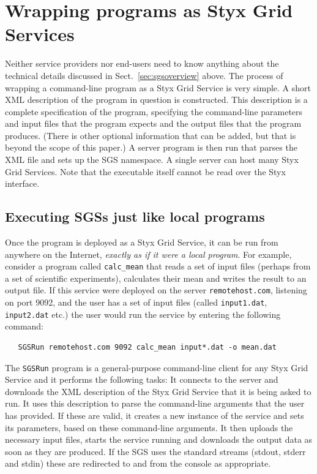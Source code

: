 \documentclass{llncs}
\begin{document}
\section{Wrapping programs as Styx Grid Services}\label{sec:wrapping}
Neither service providers nor end-users need to know anything about the technical details discussed in Sect.~\ref{sec:sgsoverview} above.  The process of wrapping a command-line program as a Styx Grid Service is very simple.  A short XML description of the program in question is constructed.  This description is a complete specification of the program, specifying the command-line parameters and input files that the program expects and the output files that the program produces.  (There is other optional information that can be added, but that is beyond the scope of this paper.)  A server program is then run that parses the XML file and sets up the SGS namespace.  A single server can host many Styx Grid Services.  Note that the executable itself cannot be read over the Styx interface.

\subsection{Executing SGSs just like local programs}

Once the program is deployed as a Styx Grid Service, it can be run from anywhere on the Internet, {\em exactly as if it were a local program\/}.  For example, consider a program called {\tt calc\_mean} that reads a set of input files (perhaps from a set of scientific experiments), calculates their mean and writes the result to an output file.  If this service were deployed on the server {\tt remotehost.com}, listening on port 9092, and the user has a set of input files (called {\tt input1.dat}, {\tt input2.dat} etc.) the user would run the service by entering the following command:

\begin{verbatim}
   SGSRun remotehost.com 9092 calc_mean input*.dat -o mean.dat
\end{verbatim}

The {\tt SGSRun} program is a general-purpose command-line client for any Styx Grid Service and it performs the following tasks:  It connects to the server and downloads the XML description of the Styx Grid Service that it is being asked to run.  It uses this description to parse the command-line arguments that the user has provided.  If these are valid, it creates a new instance of the service and sets its parameters, based on these command-line arguments.  It then uploads the necessary input files, starts the service running and downloads the output data as soon as they are produced.  If the SGS uses the standard streams (stdout, stderr and stdin) these are redirected to and from the console as appropriate.
\end{document}
